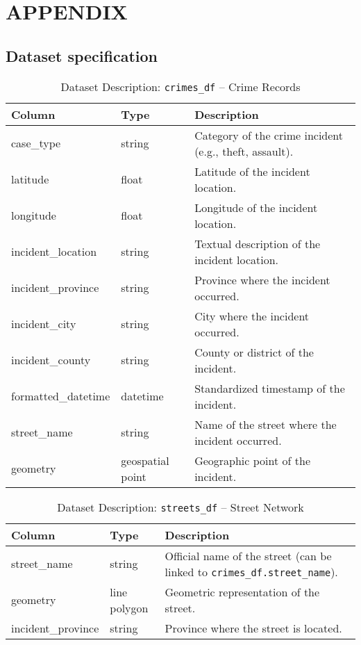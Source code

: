 \chapter*{\center \Large APPENDIX} 

\appendix
\renewcommand{\thesection}{A.\arabic{section}}


\section{Dataset specification}
\label{appendix:dataset}



\begin{table}[H]
\centering
\caption{Dataset Description: \texttt{crimes\_df} – Crime Records}
\begin{tabular}{|l|l|p{8cm}|}
\hline
\textbf{Column} & \textbf{Type} & \textbf{Description} \\
\hline
case\_type & string & Category of the crime incident (e.g., theft, assault). \\
latitude & float & Latitude of the incident location. \\
longitude & float & Longitude of the incident location. \\
incident\_location & string & Textual description of the incident location. \\
incident\_province & string & Province where the incident occurred. \\
incident\_city & string & City where the incident occurred. \\
incident\_county & string & County or district of the incident. \\
formatted\_datetime & datetime & Standardized timestamp of the incident. \\
street\_name & string & Name of the street where the incident occurred. \\
geometry & geospatial point & Geographic point of the incident. \\
\hline
\end{tabular}
\end{table}


\begin{table}[H]
\centering
\caption{Dataset Description: \texttt{streets\_df} – Street Network}
\begin{tabular}{|l|l|p{8cm}|}
\hline
\textbf{Column} & \textbf{Type} & \textbf{Description} \\
\hline
street\_name & string & Official name of the street (can be linked to \texttt{crimes\_df.street\_name}). \\
geometry & line polygon & Geometric representation of the street. \\
incident\_province & string & Province where the street is located. \\
\hline
\end{tabular}
\end{table}


